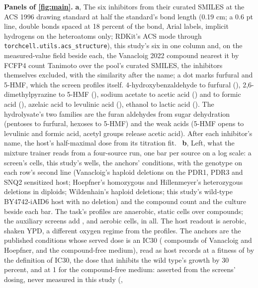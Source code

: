 \textbf{Panels of \cref{fig:main}.}
\textbf{a}, The six inhibitors from their curated SMILES at the ACS 1996 drawing
standard at half the standard's bond length (0.19 cm; a 0.6 pt line, double bonds
spaced at 18 percent of the bond, Arial labels, implicit hydrogens on the heteroatoms
only; RDKit's ACS mode through \texttt{torchcell.utils.acs\_structure}), this study's
six in one column and, on the measured-value field beside each, the Vanacloig 2022
compound nearest it by FCFP4 count Tanimoto over the pool's curated SMILES, the
inhibitors themselves excluded, with the similarity after the name; a dot marks
furfural and 5-HMF, which the screen profiles itself. 4-hydroxybenzaldehyde to furfural
(\hydneighborFfSimilarity{}), 2,6-dimethylpyrazine to 5-HMF
(\hydneighborHmfSimilarity{}), sodium acetate to acetic acid
(\hydneighborAaSimilarity{}) and to formic acid (\hydneighborFaSimilarity{}), azelaic
acid to levulinic acid (\hydneighborLvaSimilarity{}), ethanol to lactic acid
(\hydneighborLaSimilarity{}). The hydrolysate's two families are the furan aldehydes
from sugar dehydration (pentoses to furfural, hexoses to 5-HMF) and the weak acids
(5-HMF opens to levulinic and formic acid, acetyl groups release acetic acid). After
each inhibitor's name, the host's half-maximal dose from its titration fit.
\,
\textbf{b}, Left, what the mixture trainer reads from a four-source run, one bar per
source on a log scale: a screen's cells, this study's wells, the anchors' conditions,
with the genotype on each row's second line (Vanacloig's haploid deletions on the
PDR1, PDR3 and SNQ2 sensitized host; Hoepfner's homozygous and Hillenmeyer's
heterozygous deletions in diploids; Wildenhain's haploid deletions; this study's
wild-type BY4742-iAID6 host with no deletion) and the compound count and the culture
beside each bar. The task's profiles are
\hydnVanacloigCells{} anaerobic, static cells over \hydnVanacloigCompounds{} compounds;
the auxiliary screens add \hydnHoepfnerCells{}, \hydnHillenmeyerCells{} and
\hydnWildenhainCells{} aerobic cells, \hydnFourSourceCells{} in all. The host readout is
aerobic, shaken YPD, a different oxygen regime from the profiles. The anchors are the
\hydnAnchorsFour{} published conditions whose served dose is an IC30 (\hydnAnchorCompounds{}
compounds of Vanacloig and Hoepfner, and the compound-free medium), read as host records
at a fitness of \hydicThirtyFitness{} by the definition of IC30, the dose that inhibits
the wild type's growth by 30 percent, and at 1 for the compound-free medium: asserted
from the screens' dosing, never measured in this study (,
